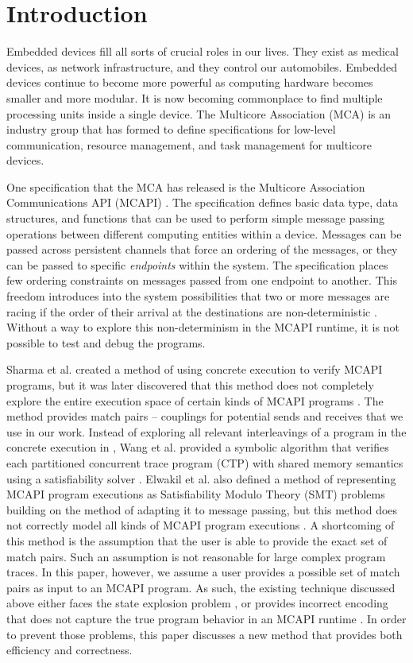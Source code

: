 \section{Introduction}
Embedded devices fill all sorts of crucial roles in our lives. They exist as
medical devices, as network infrastructure, and they control our automobiles.
Embedded devices continue to become more powerful as computing hardware becomes
smaller and more modular. It is now becoming commonplace to find multiple
processing units inside a single device. The Multicore Association (MCA) \cite{mca} is an
industry group that has formed to define specifications for low-level
communication, resource management, and task management for
multicore devices.

One specification that the MCA has released is the Multicore Association
Communications API (MCAPI) \cite{mcapi}. The specification defines basic data type, data
structures, and functions that can be used to perform simple message passing
operations between different computing entities within a device. Messages can be
passed across persistent channels that force an ordering of the messages, or
they can be passed to specific \emph{endpoints} within the system. The specification places few ordering constraints on messages passed from one
endpoint to another. This freedom introduces into the system possibilities that two or more messages are racing if the order of their arrival at the destinations are non-deterministic \cite{netzer:spdt96}. Without a way to explore this non-determinism in the MCAPI runtime, it is not possible to test and debug the programs.

Sharma et al. created a method of using concrete execution to verify MCAPI
programs, but it was later discovered that this method does not completely
explore the entire execution space of certain kinds of MCAPI programs \cite{sharma:fmcad09}. The method provides match pairs -- couplings for potential sends and receives that we use in our work. Instead of exploring all relevant interleavings of a program in the concrete execution in \cite{sharma:fmcad09}, Wang et al. provided a symbolic algorithm that verifies each partitioned concurrent trace program (CTP) with shared memory semantics using a satisfiability solver \cite{wang:fse09}. Elwakil et al. also defined a method of representing MCAPI program executions as Satisfiability Modulo Theory (SMT) problems building on the method of \cite{wang:fse09} adapting it to message passing, but this method does not correctly model all kinds of MCAPI program executions \cite{elwakil:padtad10}. A shortcoming of this method is the assumption that the user is able to provide the exact set of match pairs. Such an assumption is not reasonable for large complex program traces. In this paper, however, we assume a user provides a possible set of match pairs as input to an MCAPI program. As such, the existing technique discussed above either faces the state explosion problem \cite{sharma:fmcad09}, or provides incorrect encoding that does not capture the true program behavior in an MCAPI runtime \cite{elwakil:padtad10}. In order to prevent those problems, this paper discusses a new method that provides both efficiency and correctness. 

